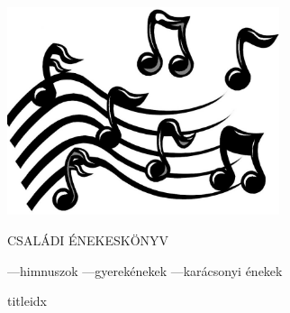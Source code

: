 \documentclass[letterpaper]{article}
\begin{document}
\quad 

\begin{center}
\vspace{3cm}
\includegraphics[width=0.6\textwidth]{music}
\vspace{3cm}
\end{center}
\begin{center}
{\fontsize{60}{60}\selectfont CSALÁDI ÉNEKESKÖNYV}
\end{center}



\begin{center}
---himnuszok
---gyerekénekek
---karácsonyi énekek
\end{center}
\newpage

\begin{songs}{titleidx}

\end{songs}
\end{document}

